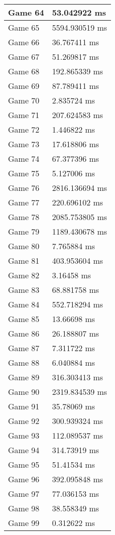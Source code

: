 \begin{multicols}{2}
\begin{tabular}{|l|l|}
	Game 64 & 53.042922 ms \\ \hline
	Game 65 & 5594.930519 ms \\ \hline
	Game 66 & 36.767411 ms \\ \hline
	Game 67 & 51.269817 ms \\ \hline
	Game 68 & 192.865339 ms \\ \hline
	Game 69 & 87.789411 ms \\ \hline
	Game 70 & 2.835724 ms \\ \hline
	Game 71 & 207.624583 ms \\ \hline
	Game 72 & 1.446822 ms \\ \hline
	Game 73 & 17.618806 ms \\ \hline
	Game 74 & 67.377396 ms \\ \hline
	Game 75 & 5.127006 ms \\ \hline
	Game 76 & 2816.136694 ms \\ \hline
	Game 77 & 220.696102 ms \\ \hline
	Game 78 & 2085.753805 ms \\ \hline
	Game 79 & 1189.430678 ms \\ \hline
	Game 80 & 7.765884 ms \\ \hline
	Game 81 & 403.953604 ms \\ \hline
	Game 82 & 3.16458 ms \\ \hline
	Game 83 & 68.881758 ms \\ \hline
	Game 84 & 552.718294 ms \\ \hline
	Game 85 & 13.66698 ms \\ \hline
	Game 86 & 26.188807 ms \\ \hline
	Game 87 & 7.311722 ms \\ \hline
	Game 88 & 6.040884 ms \\ \hline
	Game 89 & 316.303413 ms \\ \hline
	Game 90 & 2319.834539 ms \\ \hline
	Game 91 & 35.78069 ms \\ \hline
	Game 92 & 300.939324 ms \\ \hline
	Game 93 & 112.089537 ms \\ \hline
	Game 94 & 314.73919 ms \\ \hline
	Game 95 & 51.41534 ms \\ \hline
	Game 96 & 392.095848 ms \\ \hline
	Game 97 & 77.036153 ms \\ \hline
	Game 98 & 38.558349 ms \\ \hline
	Game 99 & 0.312622 ms \\ \hline

\end{tabular}
\end{multicols}
